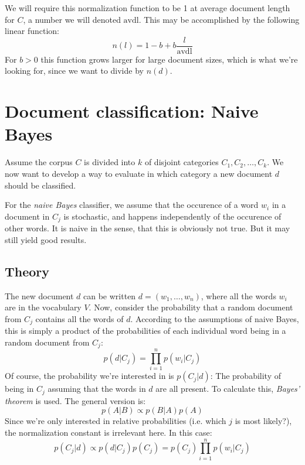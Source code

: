 \documentclass[12pt, a4paper]{article}
\numberwithin{equation}{section}
\begin{document}
We will require this normalization function to be 1 at average document length for $C$, a number we will denoted $\textrm{avdl}$. This may be accomplished by the following linear function:
\begin{equation}
n(l)=1-b+b\frac{l}{\textrm{avdl}}
\end{equation}
For $b>0$ this function grows larger for large document sizes, which is what we're looking for, since we want to divide by $n(d)$.


\section{Document classification: Naive Bayes}
Assume the corpus $C$ is divided into $k$ of disjoint categories $C_1, C_2,\ldots, C_k$. We now want to develop a way to evaluate in which category a new document $d$ should be classified.

For the \textit{naive Bayes} classifier, we assume that the occurence of a word $w_i$ in a document in $C_j$ is stochastic, and happens independently of the occurence of other words. It is naive in the sense, that this is obviously not true. But it may still yield good results.

\subsection{Theory}
The new document $d$ can be written $d=(w_1,\ldots,w_n)$, where all the words $w_i$ are in the vocabulary $V$. Now, consider the probability that a random document from $C_j$ contains all the words of $d$. According to the assumptions of naive Bayes, this is simply a product of the probabilities of each individual word being in a random document from $C_j$:
\begin{equation}
p(d|C_j)=\prod_{i=1}^n p(w_i|C_j)
\end{equation}
Of course, the probability we're interested in is $p(C_j|d)$: The probability of being in $C_j$ assuming that the words in $d$ are all present. To calculate this, \textit{Bayes' theorem} is used. The general version is:
\begin{equation}
p(A|B)\propto p(B|A)p(A)
\end{equation}
Since we're only interested in relative probabilities (i.e. which $j$ is most likely?), the normalization constant is irrelevant here. In this case:
\begin{equation}
p(C_j|d)\propto p(d|C_j)p(C_j)=p(C_j)\prod_{i=1}^n p(w_i|C_j)
\end{equation}
\end{document}
